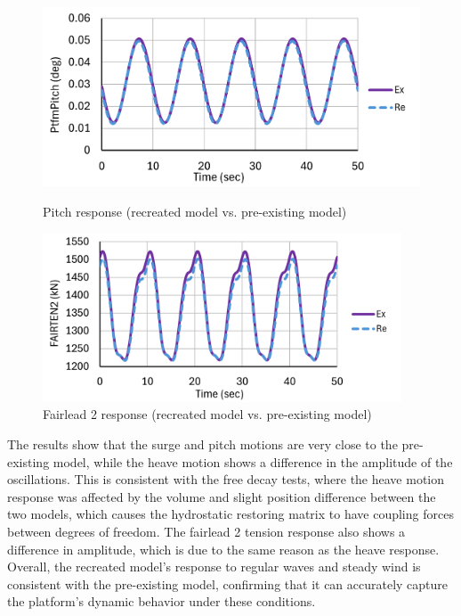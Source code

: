 \documentclass[a4paper, 11pt]{article}
\begin{document}
\begin{figure}[H]
    \begin{minipage}{0.48\textwidth}
        \centering
        \includegraphics[width=1\textwidth]{3.1_pitch_mine.png}
        \caption{\small Pitch response (recreated model vs. pre-existing model)}
        \label{fig:3.1_pitch_mine_recreated}
    \end{minipage}
    \hfill
    \begin{minipage}{0.5\textwidth}
        \centering
        \includegraphics[width=0.95\textwidth]{3.1_fairten_mine.png}
        \caption{\small Fairlead 2 response (recreated model vs. pre-existing model)}
        \label{fig:3.1_fairten_mine_recreated}
    \end{minipage}
\end{figure}

The results show that the surge and pitch motions are very close to the pre-existing model, while the heave motion shows a difference in the amplitude of the oscillations. This is consistent with the free decay tests, where the heave motion response was affected by the volume and slight position difference between the two models, which causes the hydrostatic restoring matrix to have coupling forces between degrees of freedom. The fairlead 2 tension response also shows a difference in amplitude, which is due to the same reason as the heave response. Overall, the recreated model's response to regular waves and steady wind is consistent with the pre-existing model, confirming that it can accurately capture the platform's dynamic behavior under these conditions.
\end{document}
